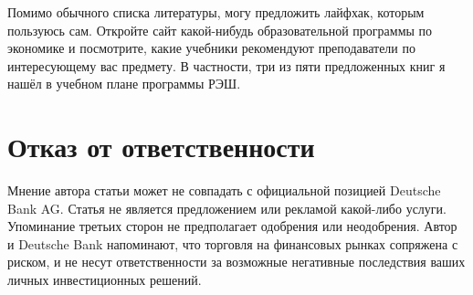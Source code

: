 Помимо обычного списка литературы, могу предложить лайфхак, которым пользуюсь сам. Откройте сайт какой-нибудь образовательной программы по экономике и посмотрите, какие учебники рекомендуют преподаватели по интересующему вас предмету. В частности, три из пяти предложенных книг я нашёл в учебном плане программы  РЭШ.

\section*{Отказ от ответственности}

Мнение автора статьи может не совпадать с официальной позицией Deutsche Bank AG.
Статья не является предложением или рекламой какой-либо услуги. Упоминание
третьих сторон не предполагает одобрения или неодобрения. Автор и Deutsche Bank
напоминают, что торговля на финансовых рынках сопряжена с риском, и не несут
ответственности за возможные негативные последствия ваших личных инвестиционных
решений.

\en{
\printbibliography[title = \ru{Список литературы}]
}
\printendnotes

